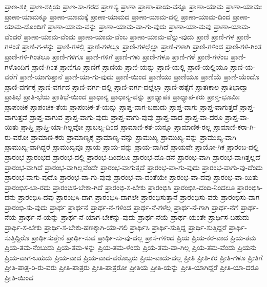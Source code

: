 {ಪ್ರಾಣ-ಶಕ್ತಿ
ಪ್ರಾಣ-ಶಕ್ತಿಯ
ಪ್ರಾಣ-ಸಾ-ಗರದ
ಪ್ರಾಣಸ್ಯ
ಪ್ರಾಣಾ
ಪ್ರಾಣಾ-ಪಾಯ-ವನ್ನೂ
ಪ್ರಾಣಾ-ಯಾಮ
ಪ್ರಾಣಾ-ಯಾಮಃ
ಪ್ರಾಣಾ-ಯಾಮಕ್ಕೂ
ಪ್ರಾಣಾ-ಯಾಮಕ್ಕೆ
ಪ್ರಾಣಾ-ಯಾಮದ
ಪ್ರಾಣಾ-ಯಾಮ-ದಲ್ಲಿ
ಪ್ರಾಣಾ-ಯಾಮ-ದಿಂದ
ಪ್ರಾಣಾ-ಯಾಮ-ದೊಂದಿಗೆ
ಪ್ರಾಣಾ-ಯಾಮ-ವನ್ನು
ಪ್ರಾಣಾ-ಯಾಮ-ವಾ-ಗು-ವುದು
ಪ್ರಾಣಾ-ಯಾ-ಮವು
ಪ್ರಾಣಾ-ಯಾಮ-ವೆಂದರೆ
ಪ್ರಾಣಾ-ಯಾಮ-ವೆಂದು
ಪ್ರಾಣಾ-ಯಾಮ-ವೆಂಬ
ಪ್ರಾಣಾ-ಯಾಮ-ವೆನ್ನು-ವುದು
ಪ್ರಾಣಿ
ಪ್ರಾಣಿ-ಗಳ
ಪ್ರಾಣಿ-ಗಳಂತೆ
ಪ್ರಾಣಿ-ಗ-ಳನ್ನು
ಪ್ರಾಣಿ-ಗಳಲ್ಲಿ
ಪ್ರಾಣಿ-ಗಳಲ್ಲೂ
ಪ್ರಾಣಿ-ಗಳಲ್ಲೆಲ್ಲಾ
ಪ್ರಾಣಿ-ಗಳಾಗಿ
ಪ್ರಾಣಿ-ಗಳಿಂದ
ಪ್ರಾಣಿ-ಗಳಿ-ಗಿಂತ
ಪ್ರಾಣಿ-ಗಳಿ-ಗಿಂತಲೂ
ಪ್ರಾಣಿ-ಗಳಿಗೂ
ಪ್ರಾಣಿ-ಗಳಿಗೆ
ಪ್ರಾಣಿ-ಗಳು
ಪ್ರಾಣಿ-ಗಳೂ
ಪ್ರಾಣಿ-ಗಳೆ
ಪ್ರಾಣಿ-ಗಳೆಂಬ
ಪ್ರಾಣಿ-ಗಳೊಂದಿಗೆ
ಪ್ರಾಣಿ-ಗಿಂತ
ಪ್ರಾಣಿಗೂ
ಪ್ರಾಣಿಗೆ
ಪ್ರಾಣಿಯ
ಪ್ರಾಣಿ-ಯನ್ನು
ಪ್ರಾಣಿ-ಯಲ್ಲಿ
ಪ್ರಾಣಿ-ಯಲ್ಲಿಯೂ
ಪ್ರಾಣಿ-ಯ-ವರೆಗೆ
ಪ್ರಾಣಿ-ಯಾಗುತ್ತಾನೆ
ಪ್ರಾಣಿ-ಯಾ-ಗು-ವುದು
ಪ್ರಾಣಿ-ಯಿಂದ
ಪ್ರಾಣಿಯು
ಪ್ರಾಣಿಯೂ
ಪ್ರಾಣಿಯೆ
ಪ್ರಾಣಿ-ಯೆಂದೊ
ಪ್ರಾಣಿ-ವರ್ಗಕ್ಕೆ
ಪ್ರಾಣಿ-ವರ್ಗದ
ಪ್ರಾಣಿ-ವರ್ಗ-ದಲ್ಲಿ
ಪ್ರಾಣಿ-ವರ್ಗ-ದಲ್ಲೆಲ್ಲಾ
ಪ್ರಾಣಿ-ಹತ್ಯೆಗೆ
ಪ್ರಾತಃಕಾಲ
ಪ್ರಾತಿಭಾದ್ವಾ
ಪ್ರಾತಿಭೆ
ಪ್ರಾತಿ-ಭೆಯ
ಪ್ರಾತಿಭೆ-ಯಿಂದ
ಪ್ರಾಧಾನ್ಯ
ಪ್ರಾಧಾನ್ಯ-ವನ್ನು
ಪ್ರಾಧ್ಯಾಪಕ
ಪ್ರಾಧ್ಯಾಪ-ಕರು
ಪ್ರಾನ್ತ-ಭೂಮಿಃ
ಪ್ರಾಪಂಚಿಕ
ಪ್ರಾಪಂಚಿಕ-ತೆಯ
ಪ್ರಾಪಂಚಿಕ-ತೆ-ಯನ್ನು
ಪ್ರಾಪ್ತ-ವಾಗ-ಬಹುದು
ಪ್ರಾಪ್ತ-ವಾಗು
ಪ್ರಾಪ್ತ-ವಾಗುತ್ತದೆ
ಪ್ರಾಪ್ತ-ವಾಗುತ್ತವೆ
ಪ್ರಾಪ್ತ-ವಾಗುವ
ಪ್ರಾಪ್ತ-ವಾಗು-ವುದು
ಪ್ರಾಪ್ತ-ವಾಗು-ವುವು
ಪ್ರಾಪ್ತ-ವಾದ
ಪ್ರಾಪ್ತ-ವಾ-ದರೂ
ಪ್ರಾಪ್ತ-ವಾ-ಯಿತು
ಪ್ರಾಪ್ತಿ
ಪ್ರಾಪ್ತಿ-ಯಾ-ಗಿಲ್ಲವೋ
ಪ್ರಾಬಲ್ಯ-ದಿಂದ
ಪ್ರಾಮಾಣಿ-ಕತೆ-ಯನ್ನೂ
ಪ್ರಾಮಾಣಿಕ-ರಲ್ಲ
ಪ್ರಾಮಾಣಿ-ಕರಾ-ಗಿ-ರು-ವರೋ
ಪ್ರಾಮಾಣಿ-ಕರು
ಪ್ರಾಮಾಣ್ಯಕ್ಕೆ
ಪ್ರಾಮಾಣ್ಯ-ವನ್ನು
ಪ್ರಾಮುಖ್ಯ
ಪ್ರಾಮುಖ್ಯ-ವನ್ನು
ಪ್ರಾಮುಖ್ಯ-ವಾಗಿ
ಪ್ರಾಮುಖ್ಯ-ವಾಗಿದ್ದರೆ
ಪ್ರಾಮುಖ್ಯವೂ
ಪ್ರಾಯ
ಪ್ರಾಯ-ವನ್ನು
ಪ್ರಾಯ-ವಾಗಿದೆ
ಪ್ರಾಯವೇ
ಪ್ರಾಯೋ-ಗಿಕ
ಪ್ರಾರಂಬ-ದಲ್ಲಿ
ಪ್ರಾರಂಭ
ಪ್ರಾರಂಭದ
ಪ್ರಾರಂಭ-ದಲ್ಲಿ
ಪ್ರಾರಂಭ-ದಿಂದಲೂ
ಪ್ರಾರಂಭ-ದೊ-ಡನೆ
ಪ್ರಾರಂಭ-ವಾಗಿ
ಪ್ರಾರಂಭ-ವಾಗಿತ್ತಲ್ಲದೆ
ಪ್ರಾರಂಭ-ವಾಗಿದೆ
ಪ್ರಾರಂಭ-ವಾಗಿಲ್ಲವೆಂದೇ
ಪ್ರಾರಂಭ-ವಾಗುತ್ತದೆ
ಪ್ರಾರಂಭ-ವಾ-ಗು-ವುದು
ಪ್ರಾರಂಭ-ವಾಗು-ವು-ದೆಂದು
ಪ್ರಾರಂಭ-ವಾಗು-ವುದೊ
ಪ್ರಾರಂಭ-ವಾ-ಗು-ವುವು
ಪ್ರಾರಂಭ-ವಾ-ದಂತೆಯೇ
ಪ್ರಾರಂಭ-ವಾ-ದವು
ಪ್ರಾರಂಭ-ವಾ-ಯಿತು
ಪ್ರಾರಂಭಿಸ-ಬಾ-ರದು
ಪ್ರಾರಂಭಿಸ-ಬೇಕಾ-ಗಿದೆ
ಪ್ರಾರಂಭಿ-ಸ-ಬೇಕು
ಪ್ರಾರಂಭಿಸಿ
ಪ್ರಾರಂಭಿಸಿ-ದಂದಿ-ನಿಂದಲೂ
ಪ್ರಾರಂಭಿಸಿ-ದನು
ಪ್ರಾರಂಭಿಸಿ-ದವು
ಪ್ರಾರಂಭಿಸಿ-ದಾಗ
ಪ್ರಾರಂಭಿಸಿ-ದಾಗಲೇ
ಪ್ರಾರಂಭಿಸುತ್ತಾನೆ
ಪ್ರಾರಂಭಿಸು-ವರು
ಪ್ರಾರಂಭಿಸು-ವಾಗ
ಪ್ರಾರಂಭಿ-ಸು-ವುದು
ಪ್ರಾರ್ಥ
ಪ್ರಾರ್ಥನೆ
ಪ್ರಾರ್ಥ-ನೆ-ಗಳಿಂದ
ಪ್ರಾರ್ಥ-ನೆ-ಗಳೆಲ್ಲ
ಪ್ರಾರ್ಥ-ನೆ-ಗಾಗಿ
ಪ್ರಾರ್ಥ-ನೆಗೆ
ಪ್ರಾರ್ಥ-ನೆಯ
ಪ್ರಾರ್ಥ-ನೆ-ಯನ್ನು
ಪ್ರಾರ್ಥ-ನೆ-ಯಾಗ-ಬೇಕೆನ್ನು-ವುದು
ಪ್ರಾರ್ಥ-ನೆಯೆ
ಪ್ರಾರ್ಥ-ಯಂತೇ
ಪ್ರಾರ್ಥಿಸ-ಬಹುದು
ಪ್ರಾರ್ಥಿ-ಸ-ಬೇಕು
ಪ್ರಾರ್ಥಿ-ಸ-ಬೇಕು-ಹಣಕ್ಕಾಗಿ-ಯಾ-ಗಲಿ
ಪ್ರಾರ್ಥಿಸಿ
ಪ್ರಾರ್ಥಿ-ಸುತ್ತಿದ್ದ
ಪ್ರಾರ್ಥಿ-ಸುತ್ತಿದ್ದರೆ
ಪ್ರಾರ್ಥಿ-ಸುತ್ತಿದ್ದಿರೊ
ಪ್ರಾರ್ಥಿಸುತ್ತೇನೆ
ಪ್ರಾರ್ಥಿ-ಸುವ
ಪ್ರಾರ್ಥಿ-ಸು-ವು-ದಲ್ಲ
ಪ್ರಾಸ-ಗಳಿಂದ
ಪ್ರಿಯ
ಪ್ರಿಯ-ಕರ-ವಾದ
ಪ್ರಿಯ-ತಮ
ಪ್ರಿಯ-ತಮ-ನೆಂಬುದು
ಪ್ರಿಯ-ತಮ-ಳನ್ನು
ಪ್ರಿಯ-ತಮ-ಳೆಂದು
ಪ್ರಿಯ-ತಮ-ವಾ-ಗಿಲ್ಲ
ಪ್ರಿಯ-ತಮ-ವೆಂದು
ಪ್ರಿಯನು
ಪ್ರಿಯ-ವಾಗ-ಬಹುದು
ಪ್ರಿಯ-ವಾದ
ಪ್ರಿಯ-ವಾದ-ವರೊಬ್ಬರು
ಪ್ರಿಯ-ವಾದು-ದಲ್ಲ
ಪ್ರೀತಿ
ಪ್ರೀತಿ-ಕರ
ಪ್ರೀತಿ-ಗಳೂ
ಪ್ರೀತಿಗೆ
ಪ್ರೀತಿ-ಪಾತ್ರ-ರಿ-ರು-ವರು
ಪ್ರೀತಿ-ಪಾತ್ರರು
ಪ್ರೀತಿ-ಪಾತ್ರರೋ
ಪ್ರೀತಿಯ
ಪ್ರೀತಿ-ಯನ್ನು
ಪ್ರೀತಿ-ಯಾಗಿದ್ದರೆ
ಪ್ರೀತಿ-ಯಾ-ದರೂ
ಪ್ರೀತಿ-ಯಿಂದ
}
